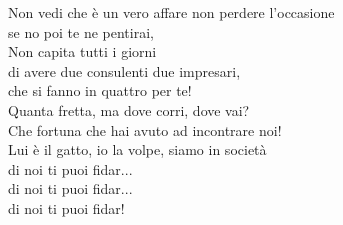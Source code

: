 \documentclass[10pt, twoside, a4paper]{article}
\begin{document}
\begin{multicols}{2}
Non vedi che \`e un vero affare non perdere l'occasione \\
se no poi te ne pentirai, \\
Non capita tutti i giorni \\
di avere due consulenti due impresari, \\
che si fanno in quattro per te! \\

Quanta fretta, ma dove corri, dove vai? \\
Che fortuna che hai avuto ad incontrare noi! \\
Lui \`e il gatto, io la volpe, siamo in societ\`a \\
di noi ti puoi fidar...\\
di noi ti puoi fidar...\\
di noi ti puoi fidar!

\end{multicols}
\end{document}

